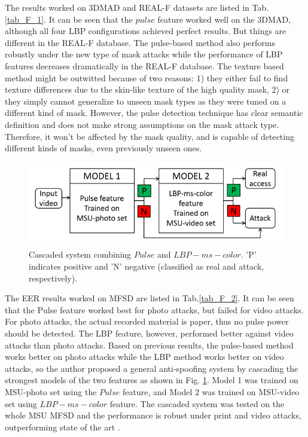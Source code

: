 \documentclass[journal]{IEEEtran}
\begin{document}
The results worked on 3DMAD and REAL-F datasets are listed in Tab.\ref{tab_F_1}. It can be seen that the $pulse$ feature worked well on the 3DMAD, although all four LBP configurations achieved perfect results. But things are different in the REAL-F database. The pulse-based method also performs robustly under the new type of mask attacks while the performance of LBP features decreases dramatically in the REAL-F database.  The texture based method might be outwitted because of two reasons: 1) they either fail to find texture differences due to the skin-like texture of the high quality mask, 2) or they simply cannot generalize to unseen mask types as they were tuned on a different kind of mask. However, the pulse detection technique has clear semantic definition and does not make strong assumptions on the mask attack type. Therefore, it won’t be affected by the mask quality, and is capable of detecting different kinds of masks, even previously unseen ones.
\begin{figure}[!t]
	\centering
	\includegraphics[width=1\linewidth]{img/F_5}
	\caption{ Cascaded system combining $Pulse$ and $LBP-ms-color$. 'P' indicates positive and 'N' negative (classified as real and attack, respectively).}
	\label{fig_F_5}
\end{figure}

The EER results worked on  MFSD  are listed in Tab.\ref{tab_F_2}. It can be seen that the Pulse feature worked best for photo attacks, but failed for video attacks. For photo attacks, the actual recorded material is paper, thus no pulse power should be detected. The LBP feature, however, performed better against video attacks than photo attacks. Based on previous results, the pulse-based method works better on photo attacks while the LBP method works better on video attacks, so the author proposed a general anti-spoofing system by cascading the strongest models of the two features as shown in Fig. \ref{fig_F_5}. Model 1 was trained on MSU-photo set using the $Pulse$ feature, and Model 2 was trained on MSU-video set using $LBP-ms-color$ feature. The cascaded system was tested on the whole MSU MFSD and the performance is robust under print and video attacks, outperforming state of the art \cite{wen2015face}.
\end{document}
